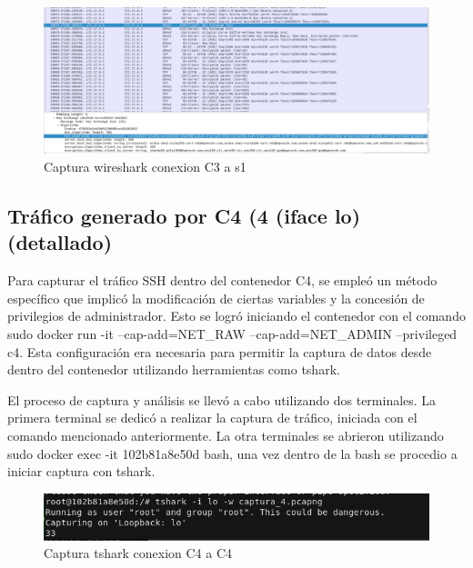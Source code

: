 \documentclass[letter,12pt]{article}
\begin{document}
    \begin{figure}[H]
        \centering
        \includegraphics[width=1\textwidth]{img/captura_c3.png}    
        \caption{Captura wireshark conexion C3 a s1}
    \end{figure}


\subsection{Tráfico generado por C4 (4 (iface lo) (detallado)}

Para capturar el tráfico SSH dentro del contenedor C4, se empleó un método específico que implicó la modificación de ciertas variables y la concesión de privilegios de administrador. Esto se logró iniciando el contenedor con el comando sudo docker run -it --cap-add=NET\_RAW --cap-add=NET\_ADMIN --privileged c4. Esta configuración era necesaria para permitir la captura de datos desde dentro del contenedor utilizando herramientas como tshark.

El proceso de captura y análisis se llevó a cabo utilizando dos terminales. La primera terminal se dedicó a realizar la captura de tráfico, iniciada con el comando mencionado anteriormente. La otra terminales se abrieron utilizando sudo docker exec -it 102b81a8e50d bash, una vez dentro de la bash se procedio a iniciar captura con tshark.



\begin{figure}[H]
        \centering
        \includegraphics[width=1\textwidth]{img/paquetes_c4.png}    
        \caption{Captura tshark conexion C4 a C4}
    \end{figure}
\end{document}
